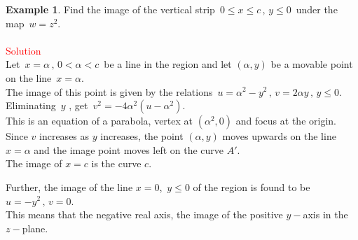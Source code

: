 \documentclass[11pt,a4paper]{article}
\theoremstyle{definition}
\newtheorem{example}[thm]{Example}
\begin{document}
\begin{example}
Find the image of the vertical strip $\, 0\leq x \leq c\,, \, y\leq 0\,$ under the map $\, w = z^2$.\\\\

\textcolor{red}{Solution}\\
Let $\, x = \alpha \,, \, 0 < \alpha < c\,$ be a line in the region and let $(\alpha ,y)$ be a movable point on the line $\, x = \alpha $.\\
The image of this point is given by the relations $\, u  = \alpha^2 - y^2\,, \, v = 2\alpha y \,, \, y\leq 0$.\\

Eliminating $\, y$ , get $\, v^2= -4\alpha^2 (u- \alpha^2)$.\\

This is an equation of a parabola, vertex at $(\alpha^2, 0)$ and focus at the origin.\\
Since $v$ increases as $y$ increases, the point $(\alpha , y)$ moves upwards on the line $ x = \alpha$ and the image point moves left on the curve $A'$.\\

The image of $x = c$ is the curve $c$.




\begin{figure}[H]
\centering
{}
\end{figure}
















Further, the image of the line $x = 0$, $\, y \leq 0$ of the region is found to be $u = -y^2\,,\, v = 0$.\\
This means that the negative real axis, the image of the positive $y-$axis in the $z-$plane.
\end{example}
\end{document}
